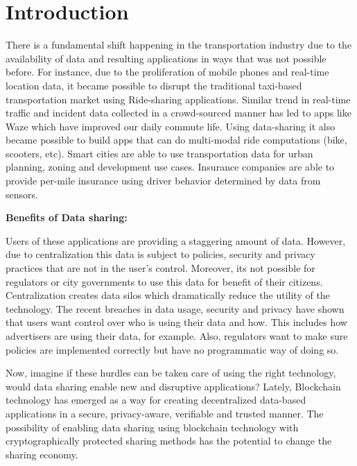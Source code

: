 \section{Introduction}\label{sec:intro}

There is a fundamental shift happening in the transportation industry due to the availability of data and resulting
applications in ways that was not possible before. For instance, due to the proliferation of mobile phones and real-time
location data, it became possible to disrupt the traditional taxi-based transportation market using Ride-sharing
applications. Similar trend in real-time traffic and incident data collected in a crowd-sourced manner has led to apps
like Waze which have improved our daily commute life. Using data-sharing it also became possible to build apps that can
do multi-modal ride computations (bike, scooters, etc). Smart cities are able to use transportation data for
urban planning, zoning and development use cases. Insurance companies are able to provide per-mile insurance using
driver behavior determined by data from sensors.

\noindent
{\bf \textsf Benefits of Data sharing:}


Users of these applications are providing a staggering amount of data. However, due to centralization this data is
subject to policies, security and privacy practices that are not in the user's control. Moreover, its not possible for
regulators or city governments to use this data for benefit of their citizens. Centralization creates data silos which
dramatically reduce the utility of the technology. The recent breaches in data usage, security and privacy have shown
that users want control over who is using their data and how. This includes how advertisers are using their data, for
example. Also, regulators want to make sure policies are implemented correctly but have no programmatic way of doing so.

Now, imagine if these hurdles can be taken care of using the right technology, would data sharing enable new and
disruptive applications? Lately, Blockchain technology has emerged as a way for creating decentralized data-based
applications in a secure, privacy-aware, verifiable and trusted manner. The possibility of enabling data sharing using
blockchain technology with cryptographically protected sharing methods has the potential to change the sharing economy.

